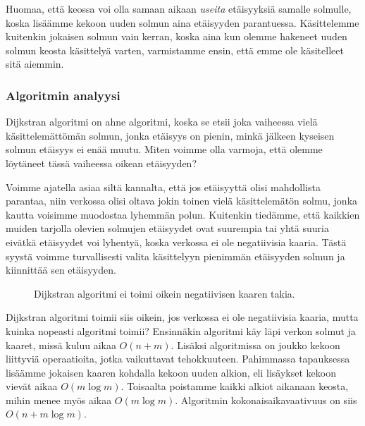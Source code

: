 Huomaa, että keossa voi olla samaan aikaan \emph{useita} etäisyyksiä
samalle solmulle, koska lisäämme kekoon uuden solmun
aina etäisyyden parantuessa.
Käsittelemme kuitenkin jokaisen solmun vain kerran,
koska aina kun olemme hakeneet uuden solmun keosta käsittelyä varten,
varmistamme ensin, että emme ole käsitelleet sitä aiemmin.

\subsubsection{Algoritmin analyysi}

Dijkstran algoritmi on ahne algoritmi,
koska se etsii joka vaiheessa
vielä käsittelemättömän solmun,
jonka etäisyys on pienin, minkä jälkeen kyseisen
solmun etäisyys ei enää muutu.
Miten voimme olla varmoja, että olemme löytäneet
tässä vaiheessa oikean etäisyyden?

Voimme ajatella asiaa siltä kannalta,
että jos etäisyyttä olisi mahdollista parantaa,
niin verkossa olisi oltava jokin toinen vielä
käsittelemätön solmu, jonka kautta voisimme muodostaa lyhemmän polun.
Kuitenkin tiedämme, että kaikkien muiden tarjolla olevien solmujen
etäisyydet ovat suurempia tai yhtä suuria eivätkä etäisyydet voi lyhentyä,
koska verkossa ei ole negatiivisia kaaria.
Tästä syystä voimme turvallisesti valita käsittelyyn pienimmän etäisyyden
solmun ja kiinnittää sen etäisyyden.

\begin{figure}
\center
\begin{center}
\end{center}
\caption{Dijkstran algoritmi ei toimi oikein negatiivisen kaaren takia.}
\label{fig:dijneg}
\end{figure}

Dijkstran algoritmi toimii siis oikein,
jos verkossa ei ole negatiivisia kaaria,
mutta kuinka nopeasti algoritmi toimii?
Ensinnäkin algoritmi käy läpi verkon solmut
ja kaaret, missä kuluu aikaa $O(n+m)$.
Lisäksi algoritmissa on joukko kekoon liittyviä operaatioita,
jotka vaikuttavat tehokkuuteen.
Pahimmassa tapauksessa lisäämme jokaisen kaaren kohdalla
kekoon uuden alkion, eli lisäykset kekoon vievät aikaa $O(m \log m)$.
Toisaalta poistamme kaikki alkiot aikanaan keosta,
mihin menee myös aikaa $O(m \log m)$.
Algoritmin kokonaisaikavaativuus on siis $O(n + m \log m)$.

